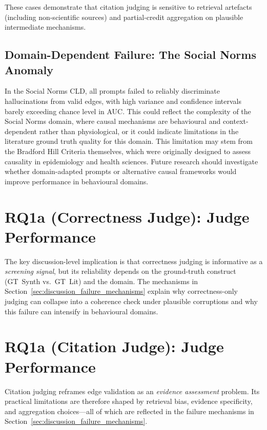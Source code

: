 These cases demonstrate that citation judging is sensitive to retrieval artefacts (including non-scientific sources) and partial-credit aggregation on plausible intermediate mechanisms.

\subsection{Domain-Dependent Failure: The Social Norms Anomaly}

In the Social Norms CLD, all prompts failed to reliably discriminate hallucinations from valid edges, with high variance and confidence intervals barely exceeding chance level in AUC. This could reflect the complexity of the Social Norms domain, where causal mechanisms are behavioural and context-dependent rather than physiological, or it could indicate limitations in the literature ground truth quality for this domain. This limitation may stem from the Bradford Hill Criteria themselves, which were originally designed to assess causality in epidemiology and health sciences. Future research should investigate whether domain-adapted prompts or alternative causal frameworks would improve performance in behavioural domains.

\section{RQ1a (Correctness Judge): Judge Performance}
\label{sec:discussion_rq1a_correctness}
The key discussion-level implication is that correctness judging is informative as a \textit{screening signal}, but its reliability depends on the ground-truth construct (GT~Synth vs.\ GT~Lit) and the domain. The mechanisms in Section~\ref{sec:discussion_failure_mechanisms} explain why correctness-only judging can collapse into a coherence check under plausible corruptions and why this failure can intensify in behavioural domains.

\section{RQ1a (Citation Judge): Judge Performance}
\label{sec:discussion_rq1a_citation}
Citation judging reframes edge validation as an \textit{evidence assessment} problem. Its practical limitations are therefore shaped by retrieval bias, evidence specificity, and aggregation choices---all of which are reflected in the failure mechanisms in Section~\ref{sec:discussion_failure_mechanisms}.

